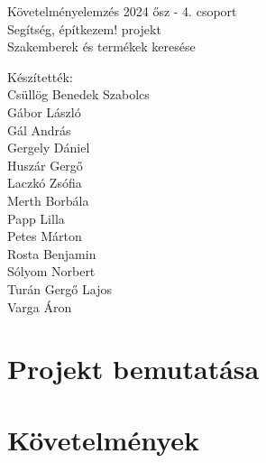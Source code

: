 \documentclass{report}
\begin{document}
\begin{titlepage}
   \centering
   \vspace{.7\baselineskip}
   { \huge
        Követelményelemzés 2024 ősz - 4. csoport \\[1em]
        Segítség, építkezem! projekt \\[2em]
        Szakemberek és termékek keresése \\ [5em]
   }

   Készítették: \\
    Csüllög Benedek Szabolcs \\
    Gábor László \\
    Gál András \\
    Gergely Dániel \\
    Huszár Gergő \\
    Laczkó Zsófia \\
    Merth Borbála \\
    Papp Lilla \\
    Petes Márton \\
    Rosta Benjamin \\
    Sólyom Norbert \\
    Turán Gergő Lajos \\
    Varga Áron \\

\end{titlepage}

\tableofcontents

\chapter{Projekt bemutatása}


\chapter{Követelmények}



\clearpage



\clearpage



\clearpage



\clearpage



\clearpage


\end{document}
